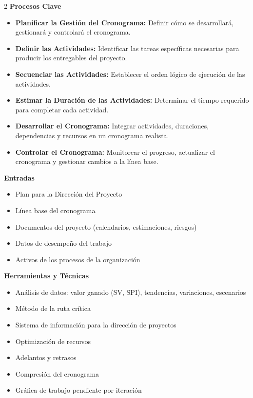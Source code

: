     \begin{multicols}{2}
      \textbf{Procesos Clave}
    \begin{itemize}
        \item \textbf{Planificar la Gestión del Cronograma:} Definir cómo se desarrollará, gestionará y controlará el cronograma.
        \item \textbf{Definir las Actividades:} Identificar las tareas específicas necesarias para producir los entregables del proyecto.
        \item \textbf{Secuenciar las Actividades:} Establecer el orden lógico de ejecución de las actividades.
        \item \textbf{Estimar la Duración de las Actividades:} Determinar el tiempo requerido para completar cada actividad.
        \item \textbf{Desarrollar el Cronograma:} Integrar actividades, duraciones, dependencias y recursos en un cronograma realista.
        \item \textbf{Controlar el Cronograma:} Monitorear el progreso, actualizar el cronograma y gestionar cambios a la línea base.
    \end{itemize}

    \textbf{Entradas}
    \begin{itemize}
        \item Plan para la Dirección del Proyecto
        \item Línea base del cronograma
        \item Documentos del proyecto (calendarios, estimaciones, riesgos)
        \item Datos de desempeño del trabajo
        \item Activos de los procesos de la organización
    \end{itemize}

    \textbf{Herramientas y Técnicas}
    \begin{itemize}
        \item Análisis de datos: valor ganado (SV, SPI), tendencias, variaciones, escenarios
        \item Método de la ruta crítica
        \item Sistema de información para la dirección de proyectos
        \item Optimización de recursos
        \item Adelantos y retrasos
        \item Compresión del cronograma
        \item Gráfica de trabajo pendiente por iteración
    \end{itemize}


\end{multicols}
